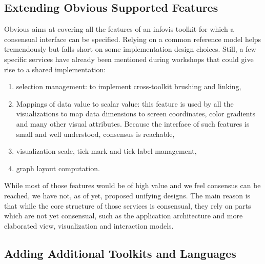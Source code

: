 
\subsection{Extending Obvious Supported Features}

Obvious aims at covering all the features of an infovis toolkit for
which a consensual interface can be specified.  Relying on a common
reference model helps tremendously but falls short on some
implementation design choices.  Still, a few specific services have
already been mentioned during workshops that could give rise to a
shared implementation:

\begin{enumerate}
\item selection management: to implement cross-toolkit brushing and
  linking,
\item Mappings of data value to scalar value: this feature is used by
  all the visualizations to map data dimensions to screen coordinates,
  color gradients and many other visual attributes. Because the
  interface of such features is small and well understood, consensus
  is reachable,
\item visualization scale, tick-mark and tick-label management,
\item graph layout computation.
\end{enumerate}

While most of those features would be of high value and we feel
consensus can be reached, we have not, as of yet, proposed unifying
designs.  The main reason is that while the core structure of those
services is consensual, they rely on parts which are not yet
consensual, such as the application architecture and more elaborated
view, visualization and interaction models.

\subsection{Adding Additional Toolkits and Languages}

\begin{comment}

A true test of how generalizable and unifying Obvious would be
post-hoc integration of a new toolkit. IBM ILOG JViews~\cite{JViews}
is one such example being considered. Because it is a commercial
product, this would have the advantage of bringing considerable
exposure to the platform.
\end{comment}

